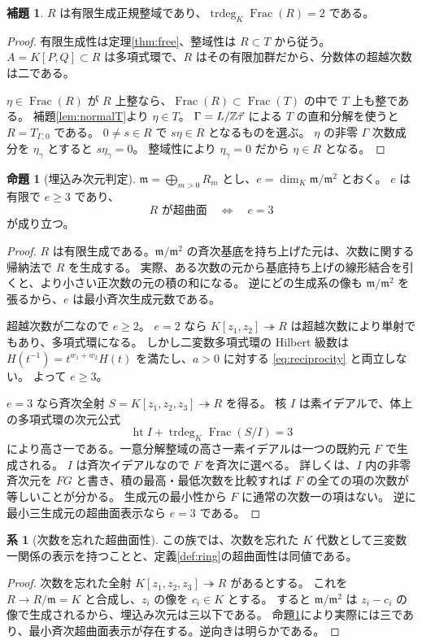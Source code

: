 \documentclass[11pt,a4paper]{ltjsarticle}
\numberwithin{equation}{section}
\theoremstyle{definition}
\newtheorem{proposition}[theorem]{命題}
\newtheorem{lemma}[theorem]{補題}
\newtheorem{corollary}[theorem]{系}
\newcommand{\Z}{\mathbb Z}\newcommand{\N}{\mathbb N}\newcommand{\Q}{\mathbb Q}\newcommand{\C}{\mathbb C}
\newcommand{\mf}{\mathfrak m}\newcommand{\NF}{\operatorname{NF}}\newcommand{\Frac}{\operatorname{Frac}}\newcommand{\trdeg}{\operatorname{trdeg}}\newcommand{\edim}{\operatorname{edim}}\newcommand{\lcm}{\operatorname{lcm}}\newcommand{\Span}{\operatorname{span}}\newcommand{\Classify}{\operatorname{Classify}}\newcommand{\CheckR}{\operatorname{Check}}\newcommand{\Admissible}{\operatorname{Admissible}}\newcommand{\ord}{\operatorname{ord}}
\begin{document}
\begin{lemma}\label{lem:normalR}
$R$ は有限生成正規整域であり、$\trdeg_K\Frac(R)=2$ である。
\end{lemma}
\begin{proof}
有限生成性は定理\ref{thm:free}、整域性は $R\subset T$ から従う。
$A=K[P,Q]\subset R$ は多項式環で、$R$ はその有限加群だから、分数体の超越次数は二である。

$\eta\in\Frac(R)$ が $R$ 上整なら、$\Frac(R)\subset\Frac(T)$ の中で $T$ 上も整である。
補題\ref{lem:normalT}より $\eta\in T$。
$\Gamma=L/\Z\ttau$ による $T$ の直和分解を使うと $R=T_{\Gamma,0}$ である。
$0\ne s\in R$ で $s\eta\in R$ となるものを選ぶ。
$\eta$ の非零 $\Gamma$ 次数成分を $\eta_\gamma$ とすると $s\eta_\gamma=0$。
整域性により $\eta_\gamma=0$ だから $\eta\in R$ となる。
\end{proof}

\begin{proposition}[埋込み次元判定]\label{prop:edim}
$\mf=\bigoplus_{m>0}R_m$ とし、$e=\dim_K\mf/\mf^2$ とおく。
$e$ は有限で $e\ge3$ であり、
\[
 R\text{ が超曲面}\quad\Longleftrightarrow\quad e=3
\]
が成り立つ。
\end{proposition}
\begin{proof}
$R$ は有限生成である。$\mf/\mf^2$ の斉次基底を持ち上げた元は、次数に関する帰納法で $R$ を生成する。
実際、ある次数の元から基底持ち上げの線形結合を引くと、より小さい正次数の元の積の和になる。
逆にどの生成系の像も $\mf/\mf^2$ を張るから、$e$ は最小斉次生成元数である。

超越次数が二なので $e\ge2$。
$e=2$ なら $K[z_1,z_2]\twoheadrightarrow R$ は超越次数により単射でもあり、多項式環になる。
しかし二変数多項式環の Hilbert 級数は
$H(t^{-1})=t^{w_1+w_2}H(t)$ を満たし、$a>0$ に対する \eqref{eq:reciprocity} と両立しない。
よって $e\ge3$。

$e=3$ なら斉次全射 $S=K[z_1,z_2,z_3]\twoheadrightarrow R$ を得る。
核 $I$ は素イデアルで、体上の多項式環の次元公式
\[
 \operatorname{ht} I+\trdeg_K\Frac(S/I)=3
\]
により高さ一である。一意分解整域の高さ一素イデアルは一つの既約元 $F$ で生成される。
$I$ は斉次イデアルなので $F$ を斉次に選べる。
詳しくは、$I$ 内の非零斉次元を $FG$ と書き、積の最高・最低次数を比較すれば $F$ の全ての項の次数が等しいことが分かる。
生成元の最小性から $F$ に通常の次数一の項はない。
逆に最小三生成元の超曲面表示なら $e=3$ である。
\end{proof}
\begin{corollary}[次数を忘れた超曲面性]\label{cor:ungraded}
この族では、次数を忘れた $K$ 代数として三変数一関係の表示を持つことと、定義\ref{def:ring}の超曲面性は同値である。
\end{corollary}
\begin{proof}
次数を忘れた全射 $K[z_1,z_2,z_3]\twoheadrightarrow R$ があるとする。
これを $R\to R/\mf=K$ と合成し、$z_i$ の像を $c_i\in K$ とする。
すると $\mf/\mf^2$ は $z_i-c_i$ の像で生成されるから、埋込み次元は三以下である。
命題\ref{prop:edim}により実際には三であり、最小斉次超曲面表示が存在する。逆向きは明らかである。
\end{proof}
\end{document}
